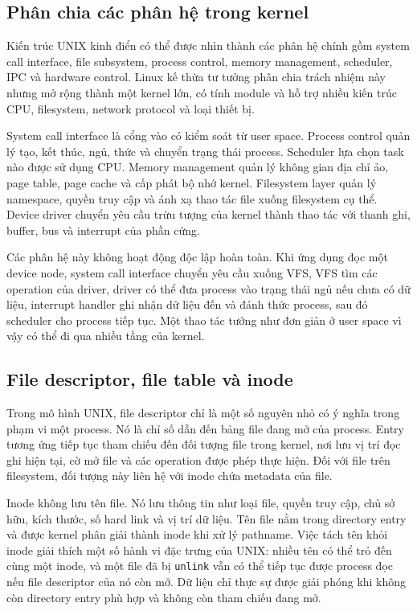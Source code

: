 \documentclass[11pt]{article}
\newcommand{\code}[1]{\texttt{#1}}
\begin{document}
\subsection{Phân chia các phân hệ trong kernel}

Kiến trúc UNIX kinh điển có thể được nhìn thành các phân hệ chính gồm system call interface, file subsystem, process control, memory management, scheduler, IPC và hardware control. Linux kế thừa tư tưởng phân chia trách nhiệm này nhưng mở rộng thành một kernel lớn, có tính module và hỗ trợ nhiều kiến trúc CPU, filesystem, network protocol và loại thiết bị.

System call interface là cổng vào có kiểm soát từ user space. Process control quản lý tạo, kết thúc, ngủ, thức và chuyển trạng thái process. Scheduler lựa chọn task nào được sử dụng CPU. Memory management quản lý không gian địa chỉ ảo, page table, page cache và cấp phát bộ nhớ kernel. Filesystem layer quản lý namespace, quyền truy cập và ánh xạ thao tác file xuống filesystem cụ thể. Device driver chuyển yêu cầu trừu tượng của kernel thành thao tác với thanh ghi, buffer, bus và interrupt của phần cứng.

Các phân hệ này không hoạt động độc lập hoàn toàn. Khi ứng dụng đọc một device node, system call interface chuyển yêu cầu xuống VFS, VFS tìm các operation của driver, driver có thể đưa process vào trạng thái ngủ nếu chưa có dữ liệu, interrupt handler ghi nhận dữ liệu đến và đánh thức process, sau đó scheduler cho process tiếp tục. Một thao tác tưởng như đơn giản ở user space vì vậy có thể đi qua nhiều tầng của kernel.

\subsection{File descriptor, file table và inode}

Trong mô hình UNIX, file descriptor chỉ là một số nguyên nhỏ có ý nghĩa trong phạm vi một process. Nó là chỉ số dẫn đến bảng file đang mở của process. Entry tương ứng tiếp tục tham chiếu đến đối tượng file trong kernel, nơi lưu vị trí đọc ghi hiện tại, cờ mở file và các operation được phép thực hiện. Đối với file trên filesystem, đối tượng này liên hệ với inode chứa metadata của file.

Inode không lưu tên file. Nó lưu thông tin như loại file, quyền truy cập, chủ sở hữu, kích thước, số hard link và vị trí dữ liệu. Tên file nằm trong directory entry và được kernel phân giải thành inode khi xử lý pathname. Việc tách tên khỏi inode giải thích một số hành vi đặc trưng của UNIX: nhiều tên có thể trỏ đến cùng một inode, và một file đã bị \code{unlink} vẫn có thể tiếp tục được process đọc nếu file descriptor của nó còn mở. Dữ liệu chỉ thực sự được giải phóng khi không còn directory entry phù hợp và không còn tham chiếu đang mở.
\end{document}
